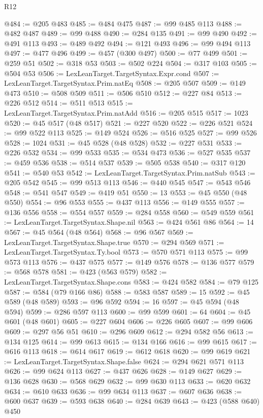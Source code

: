 \begin{lexlean}{R12}
\begin{coremodule}
@484 := @205 @483
@485 := @484 @475
@487 := @99 @485 @113
@488 := @482 @487
@489 := @99 @488
@490 := @284 @135
@491 := @99 @490
@492 := @491 @113
@493 := @489 @492
@494 := @121 @493
@496 := @99 @494 @113
@497 := @477 @496
@499 := @457 (@300 @497)
@500 := @77 @499
@501 := @259 @51
@502 := @318 @53
@503 := @502 @224
@504 := @317 @103
@505 := @504 @53
@506 := LexLeanTarget.TargetSyntax.Expr.cond
@507 := LexLeanTarget.TargetSyntax.Prim.natEq
@508 := @205 @507
@509 := @149 @473
@510 := @508 @509
@511 := @506 @510
@512 := @227 @84
@513 := @226 @512
@514 := @511 @513
@515 := LexLeanTarget.TargetSyntax.Prim.natAdd
@516 := @205 @515
@517 := 1023
@520 := @45 @517 (@48 @517)
@521 := @227 @520
@522 := @226 @521
@524 := @99 @522 @113
@525 := @149 @524
@526 := @516 @525
@527 := @99 @526
@528 := 1024
@531 := @45 @528 (@48 @528)
@532 := @227 @531
@533 := @226 @532
@534 := @99 @533
@535 := @534 @473
@536 := @527 @535
@537 := @459 @536
@538 := @514 @537
@539 := @505 @538
@540 := @317 @120
@541 := @540 @53
@542 := LexLeanTarget.TargetSyntax.Prim.natSub
@543 := @205 @542
@545 := @99 @513 @113
@546 := @440 @545
@547 := @543 @546
@548 := @541 @547
@549 := @419 @51
@550 := 13
@553 := @45 @550 (@48 @550)
@554 := @96 @553
@555 := @437 @113
@556 := @149 @555
@557 := @136 @556
@558 := @554 @557
@559 := @284 @558
@560 := @549 @559
@561 := LexLeanTarget.TargetSyntax.Shape.nil
@563 := @424 @561 @86
@564 := 14
@567 := @45 @564 (@48 @564)
@568 := @96 @567
@569 := LexLeanTarget.TargetSyntax.Shape.true
@570 := @294 @569
@571 := LexLeanTarget.TargetSyntax.Ty.bool
@573 := @570 @571 @113
@575 := @99 @573 @113
@576 := @437 @575
@577 := @149 @576
@578 := @136 @577
@579 := @568 @578
@581 := @423 (@563 @579)
@582 := LexLeanTarget.TargetSyntax.Shape.cons
@583 := @424 @582
@584 := @79 @125
@587 := @584 (@79 @166 @86)
@588 := @583 @587
@589 := 15
@592 := @45 @589 (@48 @589)
@593 := @96 @592
@594 := 16
@597 := @45 @594 (@48 @594)
@599 := @286 @597 @113
@600 := @99 @599
@601 := 64
@604 := @45 @601 (@48 @601)
@605 := @227 @604
@606 := @226 @605
@607 := @99 @606
@609 := @297 @56 @51
@610 := @296 @609
@612 := @294 @582 @56
@613 := @134 @125
@614 := @99 @613
@615 := @134 @166
@616 := @99 @615
@617 := @616 @113
@618 := @614 @617
@619 := @612 @618
@620 := @99 @619
@621 := LexLeanTarget.TargetSyntax.Shape.false
@624 := @294 @621 @571 @113
@626 := @99 @624 @113
@627 := @437 @626
@628 := @149 @627
@629 := @136 @628
@630 := @568 @629
@632 := @99 @630 @113
@633 := @620 @632
@634 := @610 @633
@636 := @99 @634 @113
@637 := @607 @636
@638 := @600 @637
@639 := @593 @638
@640 := @284 @639
@643 := @423 (@588 @640) @450

\end{coremodule}
\end{lexlean}

